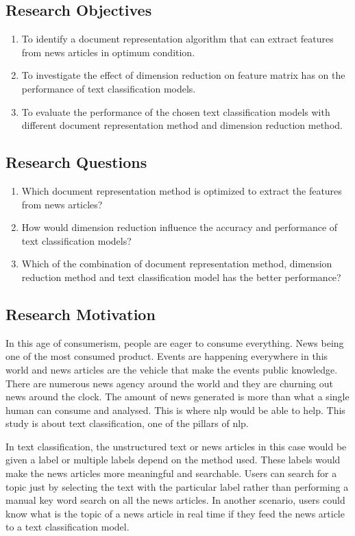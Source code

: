 \subsection{Research Objectives}
\begin{enumerate}
	\item To identify a document representation algorithm that can extract features from news articles in optimum condition.
	\item To investigate the effect of dimension reduction on feature matrix has on the performance of text classification models.
	\item To evaluate the performance of the chosen text classification models with different document representation method and dimension reduction method.
\end{enumerate}


\subsection{Research Questions}
\begin{enumerate}
	\item Which document representation method is optimized to extract the features from news articles?
	\item How would dimension reduction influence the accuracy and performance of text classification models?
	\item Which of the combination of document representation method, dimension reduction method and text classification model has the better performance?
\end{enumerate}

\subsection{Research Motivation}
In this age of consumerism, people are eager to consume everything. News being one of the most consumed product. Events are happening everywhere in this world and news articles are the vehicle that make the events public knowledge. There are numerous news agency around the world and they are churning out news around the clock. The amount of news generated is more than what a single human can consume and analysed. This is where \ac{nlp} would be able to help. This study is about text classification, one of the pillars of \ac{nlp}.

In text classification, the unstructured text or news articles in this case would be given a label or multiple labels depend on the method used. These labels would make the news articles more meaningful and searchable. Users can search for a topic just by selecting the text with the particular label rather than performing a manual key word search on all the news articles. In another scenario, users could know what is the topic of a news article in real time if they feed the news article to a text classification model.

